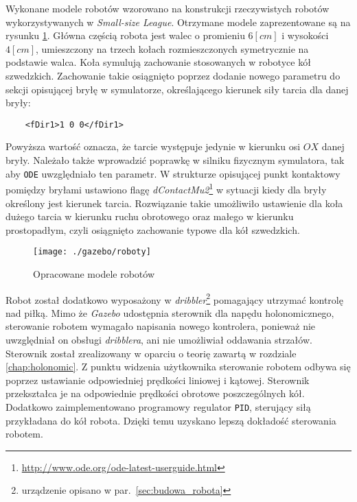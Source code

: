 	Wykonane modele robotów wzorowano na konstrukcji rzeczywistych robotów wykorzystywanych w \emph{Small-size League}. Otrzymane modele zaprezentowane są na rysunku \ref{fig:robots}.
	Główna częścią robota jest walec o promieniu $6[cm]$ i wysokości $4[cm]$, umieszczony na trzech kołach rozmieszczonych symetrycznie na podstawie walca.
	Koła symulują zachowanie stosowanych w robotyce kół szwedzkich. Zachowanie takie osiągnięto poprzez dodanie nowego parametru do sekcji opisującej bryłę w symulatorze,
	określającego kierunek siły tarcia dla danej bryły:
	\begin{lstlisting}	
	<fDir1>1 0 0</fDir1>
	\end{lstlisting}
	Powyższa wartość oznacza, że tarcie występuje jedynie w kierunku osi $OX$ danej bryły.
	Należało także wprowadzić poprawkę w silniku fizycznym symulatora, tak aby \texttt{ODE} uwzględniało ten parametr. W strukturze opisującej punkt kontaktowy pomiędzy bryłami
	ustawiono flagę \textit{dContactMu2}\protect\footnote{\url{http://www.ode.org/ode-latest-userguide.html}} w sytuacji kiedy dla bryły określony jest kierunek tarcia. Rozwiązanie takie umożliwiło ustawienie dla koła dużego tarcia w kierunku ruchu obrotowego oraz małego
	w kierunku prostopadłym, czyli osiągnięto zachowanie typowe dla kół szwedzkich.
	\begin{figure}[H]
	\centering
	\texttt{[image: ./gazebo/roboty]}
	\caption{Opracowane modele robotów  \label{fig:robots}}
	\end{figure}
	Robot został dodatkowo wyposażony w \textit{dribbler}\protect\footnote{urządzenie opisano w par.~\ref{sec:budowa_robota}} pomagający utrzymać kontrolę nad piłką.
	Mimo że \textit{Gazebo} udostępnia sterownik dla napędu holonomicznego, sterowanie robotem wymagało napisania nowego kontrolera, ponieważ nie uwzględniał on obsługi
	\textit{dribblera}, ani nie umożliwiał oddawania strzałów. Sterownik został zrealizowany w oparciu o teorię zawartą w rozdziale \ref{chap:holonomic}. Z punktu widzenia użytkownika
	sterowanie robotem odbywa się poprzez ustawianie odpowiedniej prędkości liniowej i kątowej. Sterownik przekształca je na odpowiednie prędkości obrotowe poszczególnych kół.
	Dodatkowo zaimplementowano programowy regulator \texttt{PID}, sterujący siłą przykładana do kół robota. Dzięki temu uzyskano lepszą dokładość sterowania robotem.
